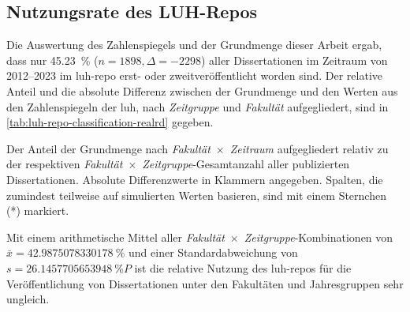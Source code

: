 \subsection{Nutzungsrate des LUH-Repos}\label{sec:luh-repo-results-zahlenspiegel}
Die Auswertung des Zahlenspiegels und der Grundmenge dieser Arbeit ergab, dass nur \SI[round-mode=places,round-precision=2]{45,23}{\percent} ($n=\num{1898},\Delta=\num{-2298}$) aller Dissertationen im Zeitraum von 2012--2023 im \gls{luh-repo} erst- oder zweitveröffentlicht worden sind.
Der relative Anteil und die absolute Differenz zwischen der Grundmenge und den Werten aus den Zahlenspiegeln der \gls{luh}, nach \textit{Zeitgruppe} und \textit{Fakultät} aufgegliedert, sind in \cref{tab:luh-repo-classification-realrd} gegeben.
\begin{table}[!htbp]
	\caption{Der Anteil der Grundmenge nach \textit{Fakultät}~$\times$~\textit{Zeitraum} aufgegliedert relativ zu der respektiven \textit{Fakultät}~$\times$~\textit{Zeitgruppe}-Gesamtanzahl aller publizierten Dissertationen.
    Absolute Differenzwerte in Klammern angegeben.
    Spalten, die zumindest teilweise auf simulierten Werten basieren, sind mit einem Sternchen (*) markiert.}
    
    \label{tab:luh-repo-zahlenspiegel-relative-grundmenge}
\end{table}

\noindent Mit einem arithmetische Mittel aller \textit{Fakultät}~$\times$~\textit{Zeitgruppe}-Kombinationen von\linebreak $\bar{x}=\SI[round-mode=places,round-precision=2]{42.9875078330178}{\percent}$ und einer Standardabweichung von $s=\SI[round-mode=places,round-precision=2]{26.1457705653948}{\percent P}$ ist die relative Nutzung des \gls{luh-repo}s für die Veröffentlichung von Dissertationen unter den Fakultäten und Jahresgruppen sehr ungleich.

